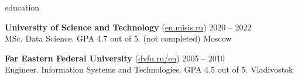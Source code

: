 \documentclass{Vladimir.Ivanov.CV}
\begin{document}
\begin{rSection}{education}

{\bf University of Science and Technology } {(\href{https://en.misis.ru}{en.misis.ru})} \hfill {2020 -- 2022} \\
MSc. Data Science. GPA 4.7 out of 5. (not completed) \hfill {Moscow}

{\bf Far Eastern Federal University} {(\href{https://www.dvfu.ru/en}{dvfu.ru/en})} \hfill {2005 -- 2010} \\
Engineer. Information Systems and Technologies. GPA 4.5 out of 5. \hfill {Vladivostok}

\end{rSection}
\end{document}
